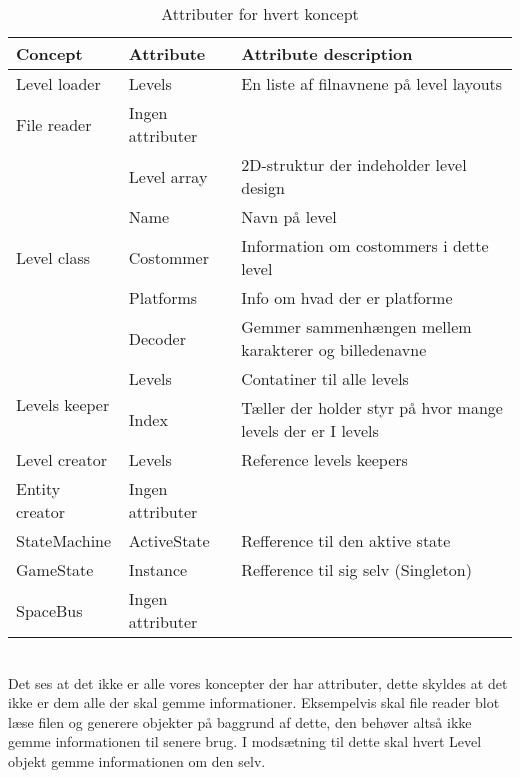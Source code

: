 \begin{table}[!h]
\hspace{-50pt}
\begin{tabular}{|l|l|l|}
\hline
\textbf{Concept}               & \textbf{Attribute} & \textbf{Attribute description}                              \\ \hline
Level loader                   & Levels             & En liste af filnavnene på level layouts                     \\ \hline
File reader                    & Ingen attributer   &                                                             \\ \hline
\multirow{5}{*}{Level class}   & Level array        & 2D-struktur der indeholder level design                     \\ \cline{2-3}
                               & Name               & Navn på level                                               \\ \cline{2-3}
                               & Costommer          & Information om costommers i dette level                     \\ \cline{2-3}
                               & Platforms          & Info om hvad der er platforme                               \\ \cline{2-3}
                               & Decoder            & Gemmer sammenhængen mellem karakterer og billedenavne       \\ \hline
\multirow{2}{*}{Levels keeper} & Levels             & Contatiner til alle levels                                  \\ \cline{2-3}
                               & Index              & Tæller der holder styr på hvor mange levels der er I levels \\ \hline
Level creator                  & Levels             & Reference levels keepers                                    \\ \hline
Entity creator                 & Ingen attributer   &                                                             \\ \hline
StateMachine & ActiveState & Refference til den aktive state \\\hline
GameState & Instance & Refference til sig selv (Singleton)\\\hline
SpaceBus & Ingen attributer & \\\hline
\end{tabular}
\caption{Attributer for hvert koncept}
\label{attributes}
\end{table}\\
Det ses at det ikke er alle vores koncepter der har attributer, dette skyldes at det ikke er dem alle der skal gemme informationer. Eksempelvis skal file reader blot læse filen og generere objekter på baggrund af dette, den behøver altså ikke gemme informationen til senere brug. I modsætning til dette skal hvert Level objekt gemme informationen om den selv.\\

